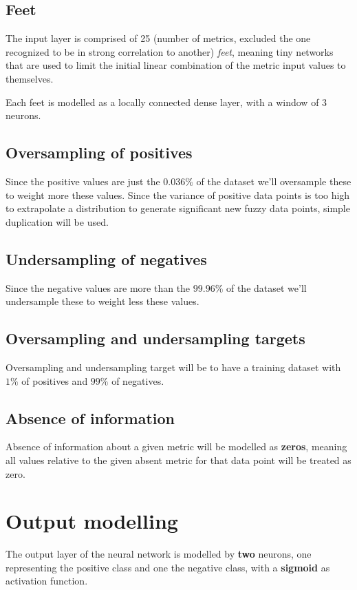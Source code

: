 \section{Feet}
The input layer is comprised of 25 (number of metrics, excluded the one recognized to be in strong correlation to another) \textit{feet}, meaning tiny networks that are used to limit the initial linear combination of the metric input values to themselves.

Each feet is modelled as a locally connected dense layer, with a window of 3 neurons.

\section{Oversampling of positives}
Since the positive values are just the \(0.036\% \) of the dataset we'll oversample these to weight more these values. Since the variance of positive data points is too high to extrapolate a distribution to generate significant new fuzzy data points, simple duplication will be used.

\section{Undersampling of negatives}
Since the negative values are more than the \(99.96\% \) of the dataset we'll undersample these to weight less these values.

\section{Oversampling and undersampling targets}
Oversampling and undersampling target will be to have a training dataset with \(1\% \) of positives and \(99\% \) of negatives.

\section{Absence of information}
Absence of information about a given metric will be modelled as \textbf{zeros}, meaning all values relative to the given absent metric for that data point will be treated as zero.

\chapter{Output modelling}
The output layer of the neural network is modelled by \textbf{two} neurons, one representing the positive class and one the negative class, with a \textbf{sigmoid} as activation function.

